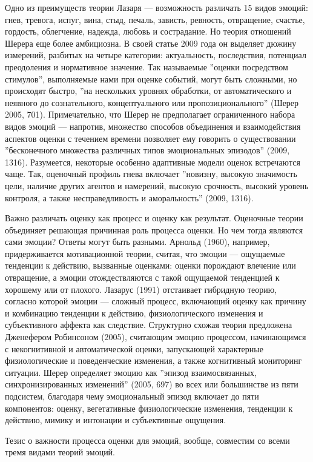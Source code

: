 \documentclass[11pt]{book}
\begin{document}
Одно из преимуществ теории Лазаря --- возможность различать 15 видов эмоций: гнев, тревога, испуг, вина, стыд, печаль, зависть, ревность, отвращение, счастье, гордость, облегчение, надежда, любовь и сострадание. Но теория отношений Шерера еще более амбициозна. В своей статье 2009 года он выделяет дюжину измерений, разбитых на четыре категории: актуальность, последствия, потенциал преодоления и нормативное значение. Так называемые ''оценки посредством стимулов'', выполняемые нами при оценке событий, могут быть сложными, но происходят быстро, ''на нескольких уровнях обработки, от автоматического и неявного до сознательного, концептуального или пропозиционального'' (Шерер 2005, 701). Примечательно, что Шерер не предполагает ограниченного набора видов эмоций --- напротив, множество способов объединения и взаимодействия аспектов оценки с течением времени позволяет ему говорить о существовании ''бесконечного множества различных типов эмоциональных эпизодов'' (2009, 1316). Разумеется, некоторые особенно адаптивные модели оценок встречаются чаще. Так, оценочный профиль гнева включает ''новизну, высокую значимость цели, наличие других агентов и намерений, высокую срочность, высокий уровень контроля, а также несправедливость и аморальность'' (2009, 1316).

Важно различать оценку как процесс и оценку как результат. Оценочные теории объединяет решающая причинная роль процесса оценки. Но чем тогда являются сами эмоции? Ответы могут быть разными. Арнольд (1960), например, придерживается мотивационной теории, считая, что эмоции --- ощущаемые тенденции к действию, вызванные оценками: оценки порождают влечение или отвращение, а эмоции отождествляются с такой ощущаемой тенденцией к хорошему или от плохого. Лазарус (1991) отстаивает гибридную теорию, согласно которой эмоции --- сложный процесс, включающий оценку как причину и комбинацию тенденции к действию, физиологического изменения и субъективного аффекта как следствие. Структурно схожая теория предложена Дженефером Робинсоном (2005), считающим эмоцию процессом, начинающимся с некогнитивной и автоматической оценки, запускающей характерные физиологические и поведенческие изменения, а также когнитивный мониторинг ситуации. Шерер определяет эмоцию как ''эпизод взаимосвязанных, синхронизированных изменений'' (2005, 697) во всех или большинстве из пяти подсистем, благодаря чему эмоциональный эпизод включает до пяти компонентов: оценку, вегетативные физиологические изменения, тенденции к действию, мимику и интонации и субъективные ощущения.

Тезис о важности процесса оценки для эмоций, вообще, совместим со всеми тремя видами теорий эмоций.
\end{document}
